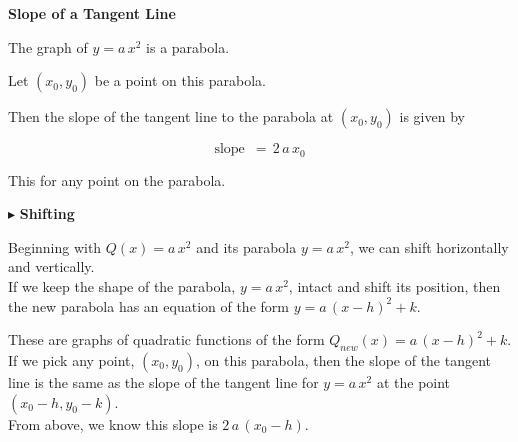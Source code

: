 \documentclass{ximera}
\begin{document}
\begin{conclusion} \textbf{\textcolor{green!50!black}{Slope of a Tangent Line}} 


The graph of $y = a \, x^2$ is a parabola.

Let $(x_0, y_0)$ be a point on this parabola.

Then the slope of the tangent line to the parabola at $(x_0, y_0)$ is given by 



\[ \text{slope } \, = \, 2 \, a \, x_0  \]


\end{conclusion}
This for any point on the parabola.




















$\blacktriangleright$ \textbf{Shifting}




Beginning with $Q(x) = a \, x^2$ and its parabola $y = a \, x^2$, we can shift horizontally and vertically. \\





If we keep the shape of the parabola, $y = a \, x^2$, intact and shift its position, then the new parabola has an equation of the form $y = a \, (x - h)^2 + k$.

These are graphs of quadratic functions of the form $Q_{new}(x) = a \, (x - h)^2 + k$. \\


If we pick any point, $(x_0, y_0)$, on this parabola, then the slope of the tangent line is the same as the slope of the tangent line for $y = a \, x^2$ at the point $(x_0 - h, y_0 - k)$.  \\

From above, we know this slope is \textbf{$2 \, a \, (x_0 - h)$}.
\end{document}
